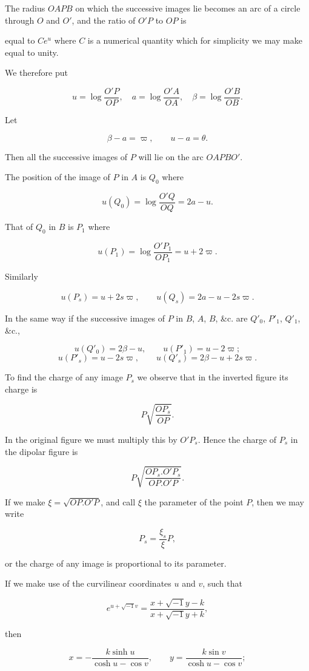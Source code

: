 \documentclass[11pt,a4paper]{article}
\begin{document}
The radius $OAPB$ on which the successive images lie becomes an arc of
a circle through $O$ and $O'$, and the ratio of $O'P$ to $OP$ is

equal to $Ce^u$ where $C$ is a numerical quantity which for simplicity
we may make equal to unity.

We therefore put

\[
u=\log\frac{O'P}{OP},\quad
a=\log\frac{O'A}{OA},\quad
\beta=\log\frac{O'B}{OB}.
\]

Let

\[
\beta - a = \varpi, \qquad u - a = \theta.
\]

Then all the successive images of $P$ will lie on the arc $OAPBO'$.

The position of the image of $P$ in $A$ is $Q_0$ where

\[
u(Q_0)=\log\frac{O'Q}{OQ}=2a-u.
\]

That of $Q_0$ in $B$ is $P_1$ where

\[
u(P_1)=\log\frac{O'P_1}{OP_1}=u+2\varpi.
\]

Similarly

\[
u(P_s)=u+2s\varpi,\qquad
u(Q_s)=2a-u-2s\varpi.
\]

In the same way if the successive images of $P$ in $B$, $A$, $B$,
\&c. are $Q'_0$, $P'_1$, $Q'_1$, \&c.,

\[
u(Q'_0)=2\beta-u,\qquad u(P'_1)=u-2\varpi;
\]
\[
u(P'_s)=u-2s\varpi,\qquad
u(Q'_s)=2\beta-u+2s\varpi.
\]

To find the charge of any image $P_s$ we observe that in the inverted
figure its charge is

\[
P\sqrt{\frac{OP_s}{OP}}.
\]

In the original figure we must multiply this by $O'P_s$. Hence the
charge of $P_s$ in the dipolar figure is

\[
P\sqrt{\frac{OP_s.O'P_s}{OP.O'P}}.
\]

If we make $\xi=\sqrt{OP.O'P}$, and call $\xi$ the parameter of the
point $P$, then we may write

\[
P_s=\frac{\xi_s}{\xi}P,
\]

or the charge of any image is proportional to its parameter.

If we make use of the curvilinear coordinates $u$ and $v$, such that

\[
e^{u+\sqrt{-1}v} = \frac{x+\sqrt{-1}y-k}{x+\sqrt{-1}y+k},
\]

then

\[
x=-\frac{k\sinh u}{\cosh u-\cos v},\qquad
y=\frac{k\sin v}{\cosh u-\cos v};
\]
\end{document}

